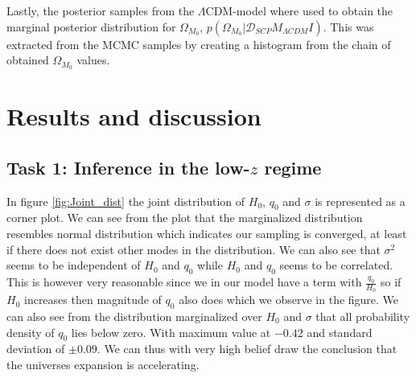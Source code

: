 \documentclass[11pt,a4paper]{article}
\begin{document}
Lastly, the posterior samples from the $\Lambda$CDM-model where used to obtain the marginal posterior distribution for $\Omega_{M_0}$, $p\left(\Omega_{M_0}\vert \mathcal{D}_{SCP} M_{\Lambda CDM} I\right)$. This was extracted from the MCMC samples by creating a histogram from the chain of obtained $\Omega_{M_0}$ values.

\section{Results and discussion}

\subsection[Task 1]{Task 1: Inference in the low-$z$ regime}
In figure \ref{fig:Joint_dist} the joint distribution of $H_0$, $q_0$ and $\sigma$ is represented as a corner plot. We can see from the plot that  the marginalized distribution resembles normal distribution which indicates our sampling is converged, at least if there does not exist other modes in the distribution. We can also see that $\sigma^2$ seems to be independent of $H_0$ and $q_0$ while $H_0$ and $q_0$ seems to be correlated. This is however very reasonable since we in our model have a term with $\frac{q_0}{H_0}$ so if $H_0$ increases then magnitude of $q_0$ also does which we observe in the figure. We can also see from the distribution marginalized over $H_0$ and $\sigma$ that all probability density of $q_0$ lies below zero. With maximum value at $-0.42$ and standard deviation of $\pm 0.09$. We can thus with very high belief draw the conclusion that the universes expansion is accelerating.  
\end{document}
